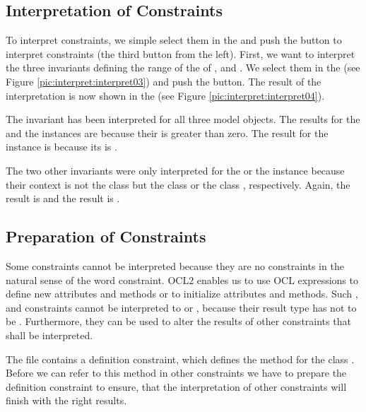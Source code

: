 \subsection{Interpretation of Constraints}

To interpret constraints, we simple select them in the  and push the button to interpret constraints (the third button from the left). First, we want to interpret the three invariants defining the range of the  of ,  and . We select them in the  (see Figure \ref{pic:interpret:interpret03}) and push the  button. The result of the interpretation is now shown in the  (see Figure \ref{pic:interpret:interpret04}).

The invariant  has been interpreted for all three model objects. The results for the  and the  instances are  because their  is greater than zero. The result for the  instance is  because its  is .

The two other invariants were only interpreted for the  or the  instance because their context is not the class  but the class  or the class , respectively. Again, the  result is  and the  result is .


\subsection{Preparation of Constraints}

Some constraints cannot be interpreted because they are no constraints in the natural sense of the word constraint. \acs{OCL}2 enables us to use \acs{OCL} expressions to define new attributes and methods or to initialize attributes and methods. Such ,  and  constraints cannot be interpreted to  or , because their result type has not to be . Furthermore, they can be used to alter the results of other constraints that shall be interpreted.

The  file contains a definition constraint, which defines the method  for the class . Before we can refer to this method in other constraints we have to prepare the definition constraint to ensure, that the interpretation of other constraints will finish with the right results.

